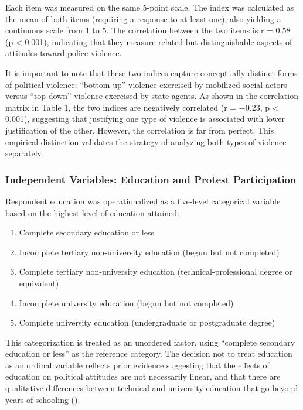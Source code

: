 \documentclass[
  13pt,
]{article}
\begin{document}
Each item was measured on the same 5-point scale. The index was
calculated as the mean of both items (requiring a response to at least
one), also yielding a continuous scale from 1 to 5. The correlation
between the two items is r = 0.58 (p \textless{} 0.001), indicating that
they measure related but distinguishable aspects of attitudes toward
police violence.

It is important to note that these two indices capture conceptually
distinct forms of political violence: ``bottom-up'' violence exercised
by mobilized social actors versus ``top-down'' violence exercised by
state agents. As shown in the correlation matrix in Table 1, the two
indices are negatively correlated (r = −0.23, p \textless{} 0.001),
suggesting that justifying one type of violence is associated with lower
justification of the other. However, the correlation is far from
perfect. This empirical distinction validates the strategy of analyzing
both types of violence separately.

\subsubsection{Independent Variables: Education and Protest
Participation}\label{independent-variables-education-and-protest-participation}

Respondent education was operationalized as a five-level categorical
variable based on the highest level of education attained:

\begin{enumerate}
\def\labelenumi{\arabic{enumi}.}
\item
  Complete secondary education or less
\item
  Incomplete tertiary non-university education (begun but not completed)
\item
  Complete tertiary non-university education (technical-professional
  degree or equivalent)
\item
  Incomplete university education (begun but not completed)
\item
  Complete university education (undergraduate or postgraduate degree)
\end{enumerate}

This categorization is treated as an unordered factor, using ``complete
secondary education or less'' as the reference category. The decision
not to treat education as an ordinal variable reflects prior evidence
suggesting that the effects of education on political attitudes are not
necessarily linear, and that there are qualitative differences between
technical and university education that go beyond years of schooling
().
\end{document}
